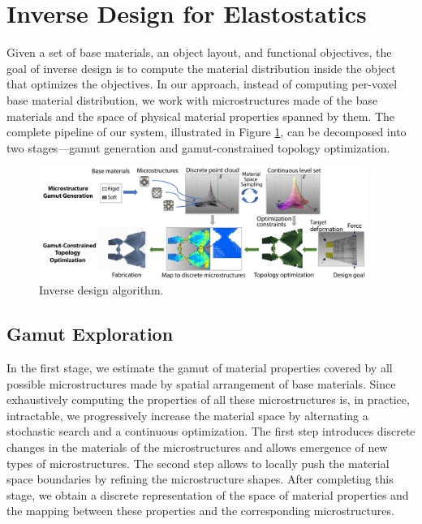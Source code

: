 \section{Inverse Design for Elastostatics}
Given a set of base materials, an object layout, and functional objectives, the goal of inverse design is to compute the material distribution inside the object that optimizes the objectives.
In our approach, instead of computing per-voxel base material distribution, we work with microstructures made of the base materials and the space of physical material properties spanned by them. The complete pipeline of our system, illustrated in Figure \ref{fig:topoptOverview}, can be decomposed into two stages---gamut generation and gamut-constrained topology optimization.
\begin{figure}[hb]
	\centering
	\includegraphics[width=0.95\textwidth]{images/topoptOverview.pdf}
	\caption{Inverse design algorithm.}
	\label{fig:topoptOverview}
\end{figure}
\subsection{Gamut Exploration}
In the first stage, we estimate the gamut of material properties covered by all possible microstructures made by spatial arrangement of base materials. 
Since exhaustively computing the properties of all these microstructures is, in practice, intractable, we progressively increase the material space by alternating a stochastic search and a continuous optimization. The first step introduces discrete changes in the materials of the microstructures and allows emergence of new types of microstructures. The second step allows to locally push the material space boundaries by refining the microstructure shapes. After completing this stage, we obtain a discrete representation of the space of material properties and the mapping between these properties and the corresponding microstructures.

